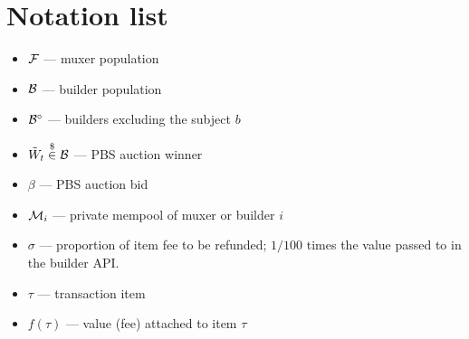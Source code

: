 \appendix

\section*{Notation list}

\begin{itemize}
\item $\mathcal{F}$ — muxer population
\item $\mathcal{B}$ — builder population
\item $\mathcal{B}^\circ$ — builders excluding the subject $b$
\item $\tilde{W}_t \stackrel{\$}{\in} \mathcal{B}$ — PBS auction winner 
\item $\beta$ — PBS auction bid
\item $\mathcal{M}_i$ — private mempool of muxer or builder $i$
\item $\sigma$ — proportion of item fee to be refunded; $1/100$ times the value passed to  in the builder API.
\item $\tau$ --- transaction item
\item $f(\tau)$ --- value (fee) attached to item $\tau$
\end{itemize} 

\printbibliography